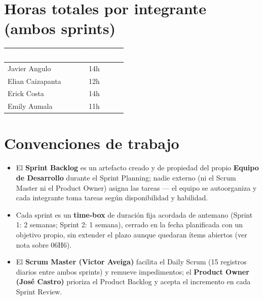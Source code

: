 \documentclass[11pt]{article}
\begin{document}
\section{Horas totales por integrante (ambos sprints)}
\begin{center}
\renewcommand{\arraystretch}{1.2}
\begin{tabular}{|l|c|}
\hline
\rowcolor{epnblue}
\textcolor{white}{\textbf{Integrante}} & \textcolor{white}{\textbf{Horas técnicas}} \\
\hline
Javier Angulo & 14h \\
\hline
\rowcolor{epnrow}
Elian Caizapanta & 12h \\
\hline
Erick Costa & 14h \\
\hline
\rowcolor{epnrow}
Emily Aumala & 11h \\
\hline
\end{tabular}
\end{center}

\section{Convenciones de trabajo}
\begin{itemize}[leftmargin=1.4cm]
  \item El \textbf{Sprint Backlog} es un artefacto creado y de propiedad del propio \textbf{Equipo de
        Desarrollo} durante el Sprint Planning; nadie externo (ni el Scrum Master ni el Product Owner)
        asigna las tareas --- el equipo se autoorganiza y cada integrante toma tareas según disponibilidad
        y habilidad.
  \item Cada sprint es un \textbf{time-box} de duración fija acordada de antemano (Sprint 1: 2 semanas;
        Sprint 2: 1 semana), cerrado en la fecha planificada con un objetivo propio, sin extender el plazo
        aunque quedaran ítems abiertos (ver nota sobre 06H6).
  \item El \textbf{Scrum Master (Victor Aveiga)} facilita el Daily Scrum (15 registros diarios entre ambos
        sprints) y remueve impedimentos; el \textbf{Product Owner (José Castro)} prioriza el Product
        Backlog y acepta el incremento en cada Sprint Review.
\end{itemize}
\end{document}
